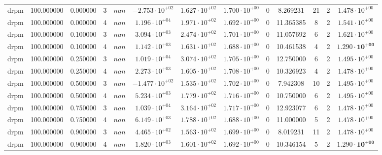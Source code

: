 \begin{table}
\begin{tabular}{ccccccccccccc}
drpm & 100.000000 & 0.000000 & 3 & $nan$ & $-2.753 \cdot 10^{+02}$ & $1.627 \cdot 10^{+02}$ & $1.700 \cdot 10^{+00}$ & 0 & 8.269231 & 21 & 2 & $1.478 \cdot 10^{+00}$ \\
drpm & 100.000000 & 0.000000 & 4 & $nan$ & $1.196 \cdot 10^{+04}$ & $1.971 \cdot 10^{+02}$ & $1.692 \cdot 10^{+00}$ & 0 & 11.365385 & 8 & 2 & $1.541 \cdot 10^{+00}$ \\
drpm & 100.000000 & 0.100000 & 3 & $nan$ & $3.094 \cdot 10^{+03}$ & $2.474 \cdot 10^{+02}$ & $1.701 \cdot 10^{+00}$ & 0 & 11.057692 & 6 & 2 & $1.621 \cdot 10^{+00}$ \\
drpm & 100.000000 & 0.100000 & 4 & $nan$ & $1.142 \cdot 10^{+03}$ & $1.631 \cdot 10^{+02}$ & $1.688 \cdot 10^{+00}$ & 0 & 10.461538 & 4 & 2 & $\mathbf{1.290 \cdot 10^{+00}}$ \\
drpm & 100.000000 & 0.250000 & 3 & $nan$ & $1.019 \cdot 10^{+04}$ & $3.074 \cdot 10^{+02}$ & $1.705 \cdot 10^{+00}$ & 0 & 12.750000 & 6 & 2 & $1.495 \cdot 10^{+00}$ \\
drpm & 100.000000 & 0.250000 & 4 & $nan$ & $2.273 \cdot 10^{+03}$ & $1.605 \cdot 10^{+02}$ & $1.708 \cdot 10^{+00}$ & 0 & 10.326923 & 4 & 2 & $1.478 \cdot 10^{+00}$ \\
drpm & 100.000000 & 0.500000 & 3 & $nan$ & $-1.477 \cdot 10^{+02}$ & $1.535 \cdot 10^{+02}$ & $1.702 \cdot 10^{+00}$ & 0 & 7.942308 & 10 & 2 & $1.495 \cdot 10^{+00}$ \\
drpm & 100.000000 & 0.500000 & 4 & $nan$ & $5.234 \cdot 10^{+03}$ & $1.779 \cdot 10^{+02}$ & $1.716 \cdot 10^{+00}$ & 0 & 10.750000 & 6 & 2 & $1.495 \cdot 10^{+00}$ \\
drpm & 100.000000 & 0.750000 & 3 & $nan$ & $1.039 \cdot 10^{+04}$ & $3.164 \cdot 10^{+02}$ & $1.717 \cdot 10^{+00}$ & 0 & 12.923077 & 6 & 2 & $1.478 \cdot 10^{+00}$ \\
drpm & 100.000000 & 0.750000 & 4 & $nan$ & $6.149 \cdot 10^{+03}$ & $1.788 \cdot 10^{+02}$ & $1.688 \cdot 10^{+00}$ & 0 & 11.000000 & 5 & 2 & $1.478 \cdot 10^{+00}$ \\
drpm & 100.000000 & 0.900000 & 3 & $nan$ & $4.465 \cdot 10^{+02}$ & $1.563 \cdot 10^{+02}$ & $1.699 \cdot 10^{+00}$ & 0 & 8.019231 & 11 & 2 & $1.478 \cdot 10^{+00}$ \\
drpm & 100.000000 & 0.900000 & 4 & $nan$ & $1.820 \cdot 10^{+03}$ & $1.601 \cdot 10^{+02}$ & $1.692 \cdot 10^{+00}$ & 0 & 10.346154 & 5 & 2 & $\mathbf{1.290 \cdot 10^{+00}}$ \\
\bottomrule
\end{tabular}
\end{table}
